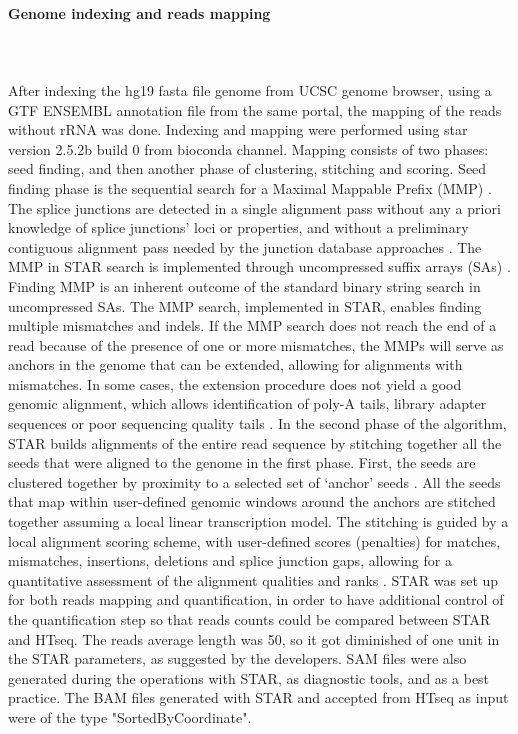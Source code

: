 \documentclass[12pt]{article}
\begin{document}
\paragraph{Genome indexing and reads mapping}\hspace{0pt}\\\\
After indexing the hg19 fasta file genome from UCSC genome browser, using a GTF ENSEMBL annotation file from the same portal, the mapping of the reads without rRNA was done. Indexing and mapping were performed using star version 2.5.2b build 0 from bioconda channel. Mapping consists of two phases: seed finding, and then another phase of clustering, stitching and scoring. Seed finding phase is the sequential search for a Maximal Mappable Prefix (MMP) \supercite{dobin2013star}. 
The splice junctions are detected in a
single alignment pass without any a priori knowledge of splice
junctions’ loci or properties, and without a preliminary contiguous alignment pass needed by the junction database approaches \supercite{dobin2013star}. 
The MMP in STAR search is implemented through uncompressed suffix arrays (SAs) \supercite{manber1993suffix}. Finding MMP is an inherent outcome of the standard binary string search in uncompressed SAs. The MMP search, implemented in STAR, enables finding multiple mismatches and indels. If the MMP search does
not reach the end of a read because of the presence of one or
more mismatches, the MMPs will serve as anchors in the genome
that can be extended, allowing for alignments with mismatches.
In some cases, the extension procedure does not yield a good
genomic alignment, which allows identification of poly-A tails,
library adapter sequences or poor sequencing quality tails \supercite{dobin2013star}.
In the second phase of the algorithm, STAR builds alignments of the entire read sequence by stitching together all the seeds that were aligned to the genome in the first phase. First, the seeds are clustered together by proximity to a selected set of ‘anchor’ seeds \supercite{dobin2013star}. 
All the seeds that map within user-defined genomic windows
around the anchors are stitched together assuming a local linear
transcription model. The stitching is guided by a local alignment scoring scheme, with user-defined scores (penalties) for matches, mismatches, insertions, deletions and splice junction gaps, allowing for a quantitative assessment of the alignment qualities and ranks \supercite{dobin2013star}. 
STAR was set up for both reads mapping and quantification, in order to have additional control of the quantification step so that reads counts could be compared between STAR and HTseq. The reads average length was 50, so it got diminished of one unit in the STAR parameters, as suggested by the developers. SAM files were also generated during the operations with STAR, as diagnostic tools, and as a best practice. The BAM files generated with STAR and accepted from HTseq as input were of the type "SortedByCoordinate".
\end{document}
